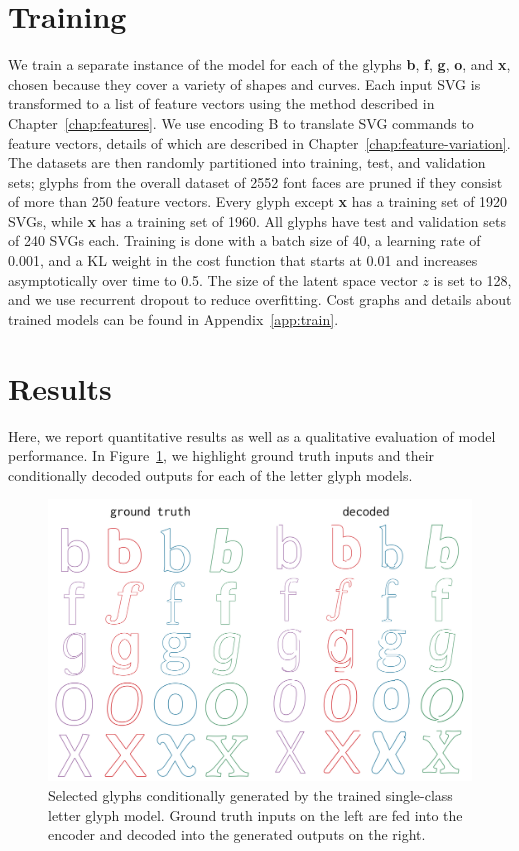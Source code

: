 \section{Training}\label{sec:training}
We train a separate instance of the model for each of the glyphs \textbf{b}, \textbf{f}, \textbf{g}, \textbf{o}, and \textbf{x}, chosen because they cover a variety of shapes and curves.
Each input SVG is transformed to a list of feature vectors using the method described in Chapter~\ref{chap:features}.
We use encoding B to translate SVG commands to feature vectors, details of which are described in Chapter~\ref{chap:feature-variation}.
The datasets are then randomly partitioned into training, test, and validation sets; glyphs from the overall dataset of 2552 font faces are pruned if they consist of more than 250 feature vectors.
Every glyph except \textbf{x} has a training set of 1920 SVGs, while \textbf{x} has a training set of 1960.
All glyphs have test and validation sets of 240 SVGs each.
Training is done with a batch size of 40, a learning rate of 0.001, and a KL weight in the cost function that starts at 0.01 and increases asymptotically over time to 0.5.
The size of the latent space vector $z$ is set to 128, and we use recurrent dropout to reduce overfitting.
Cost graphs and details about trained models can be found in Appendix~\ref{app:train}.

\section{Results}
Here, we report quantitative results as well as a qualitative evaluation of model performance.
In Figure~\ref{fig:font_gen}, we highlight ground truth inputs and their conditionally decoded outputs for each of the letter glyph models.
\begin{figure}[h]
    \centering
	\includegraphics[width=\textwidth]{figures/font_gen}
    \caption[Visual results of training single-class model on letter glyph datasets]
    {Selected glyphs conditionally generated by the trained single-class letter glyph model.
    Ground truth inputs on the left are fed into the encoder and decoded into the generated outputs on the right.\label{fig:font_gen}}
\end{figure}

